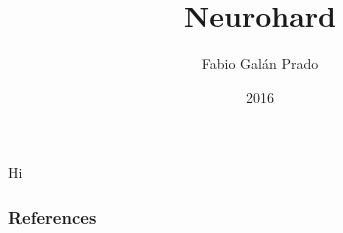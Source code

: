 \documentclass[10pt,t]{beamer}
\title{Neurohard}
\author{Fabio Galán Prado}
\date[2016]{2016}
\begin{document}
\begin{frame}
Hi \cite{158511}
\end{frame}

\begin{frame}
\frametitle{References}


\end{frame}
\end{document}
